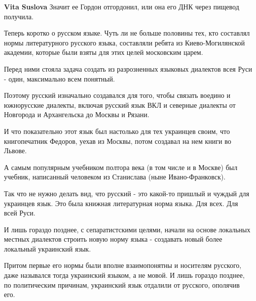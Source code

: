 \begin{itemize}
\begin{itemize}
 
\textbf{Vita Suslova} Значит ее Гордон отгордонил, или она его ДНК через пищевод получила.

 

Теперь коротко о русском языке. Чуть ли не больше половины тех, кто составлял
нормы литературного русского языка, составляли ребята из Киево-Могилянской
академии, которые были взяты для этих целей московским царем.

Перед ними стояла задача создать из разрозненных языковых диалектов всея Руси -
один, максимально всем понятный.

Поэтому русский изначально создавался для того, чтобы связать воедино и
южнорусские диалекты, включая русский язык ВКЛ и северные диалекты от Новгорода
и Архангельска до Москвы и Рязани.

И что показательно этот язык был настолько для тех украинцев своим, что
книгопечатник Федоров, уехав из Москвы, потом создавал на нем книги во Львове.

А самым популярным учебником полтора века (в том числе и в Москве) был учебник,
написанный человеком из Станислава (ныне Ивано-Франковск).

Так что не нужно делать вид, что русский - это какой-то пришлый и чуждый для
украинцев язык. Это была книжная литературная норма языка. Для всех. Для всей
Руси.

И лишь гораздо позднее, с сепаратистскими целями, начали на основе локальных
местных диалектов строить новую норму языка - создавать новый более локальный
украинский язык.

Притом первые его нормы были вполне взаимопонятны и носителям русского, даже
назывался тогда украинский языком, а не мовой. И лишь гораздо позднее, по
политическим причинам, украинский язык отдалили от русского, ополячив его.

 

\end{itemize}
\end{itemize}

